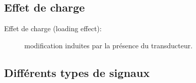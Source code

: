 \documentclass[10pt]{article} %
\begin{document}
\begin{multicols}{3}
\begin{flushleft}
		\subsection*{Effet de charge}
			
			\begin{description}
				\item[Effet de charge (loading effect):] modification induites par la présence du transducteur.
			\end{description}

		\subsection*{Différents types de signaux}
			

\end{flushleft}
\end{multicols}
\end{document}
